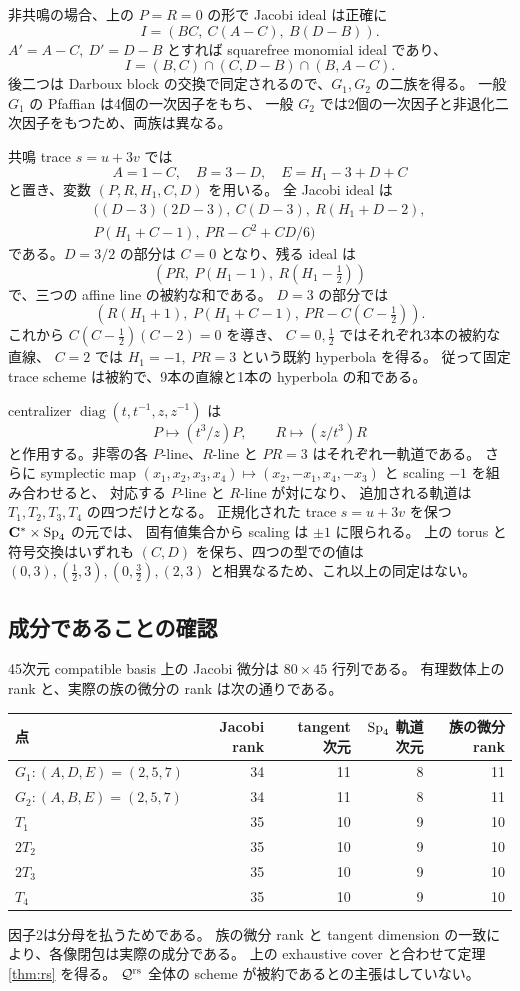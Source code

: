 \documentclass[11pt,a4paper]{ltjsarticle}
\DeclareMathOperator{\diag}{diag}
\theoremstyle{remark}\newtheorem{remark}[theorem]{注意}\renewcommand{\proofname}{証明}
\begin{document}
非共鳴の場合、上の $P=R=0$ の形で Jacobi ideal は正確に
\[
 I=(BC,\ C(A-C),\ B(D-B)).
\]
$A'=A-C,\ D'=D-B$ とすれば squarefree monomial ideal であり、
\[
 I=(B,C)\cap(C,D-B)\cap(B,A-C).
\]
後二つは Darboux block の交換で同定されるので、$G_1,G_2$ の二族を得る。
一般 $G_1$ の Pfaffian は4個の一次因子をもち、
一般 $G_2$ では2個の一次因子と非退化二次因子をもつため、両族は異なる。

共鳴 trace $s=u+3v$ では
\[
 A=1-C,\quad B=3-D,\quad E=H_1-3+D+C
\]
と置き、変数 $(P,R,H_1,C,D)$ を用いる。
全 Jacobi ideal は
\begin{equation}\label{eq:resideal}
\begin{split}
 ((D-3)(2D-3),\ C(D-3),\
 R(H_1+D-2),\\
 P(H_1+C-1),\ PR-C^2+CD/6)
\end{split}
\end{equation}
である。$D=3/2$ の部分は $C=0$ となり、残る ideal は
\[
 (PR,\ P(H_1-1),\ R(H_1-\tfrac12))
\]
で、三つの affine line の被約な和である。
$D=3$ の部分では
\[
 (R(H_1+1),\ P(H_1+C-1),\ PR-C(C-\tfrac12)).
\]
これから $C(C-\tfrac12)(C-2)=0$ を導き、
$C=0,\tfrac12$ ではそれぞれ3本の被約な直線、
$C=2$ では $H_1=-1,\ PR=3$ という既約 hyperbola を得る。
従って固定 trace scheme は被約で、9本の直線と1本の hyperbola の和である。

centralizer $\diag(t,t^{-1},z,z^{-1})$ は
\[
 P\mapsto(t^3/z)P,\qquad R\mapsto(z/t^3)R
\]
と作用する。非零の各 $P$-line、$R$-line と $PR=3$ はそれぞれ一軌道である。
さらに symplectic map
$(x_1,x_2,x_3,x_4)\mapsto(x_2,-x_1,x_4,-x_3)$ と scaling $-1$ を組み合わせると、
対応する $P$-line と $R$-line が対になり、
追加される軌道は $T_1,T_2,T_3,T_4$ の四つだけとなる。
正規化された trace $s=u+3v$ を保つ $\mathbf C^*\times\operatorname{Sp}_4$ の元では、
固有値集合から scaling は $\pm1$ に限られる。
上の torus と符号交換はいずれも $(C,D)$ を保ち、四つの型での値は
$(0,3),(\tfrac12,3),(0,\tfrac32),(2,3)$ と相異なるため、これ以上の同定はない。

\subsection{成分であることの確認}
45次元 compatible basis 上の Jacobi 微分は $80\times45$ 行列である。
有理数体上の rank と、実際の族の微分の rank は次の通りである。
\begin{center}
\begin{tabular}{lrrrr}
\toprule
点 & Jacobi rank & tangent 次元 & $\operatorname{Sp}_4$ 軌道次元 & 族の微分 rank\\
\midrule
$G_1:(A,D,E)=(2,5,7)$&34&11&8&11\\
$G_2:(A,B,E)=(2,5,7)$&34&11&8&11\\
$T_1$&35&10&9&10\\
$2T_2$&35&10&9&10\\
$2T_3$&35&10&9&10\\
$T_4$&35&10&9&10\\
\bottomrule
\end{tabular}
\end{center}
因子2は分母を払うためである。
族の微分 rank と tangent dimension の一致により、各像閉包は実際の成分である。
上の exhaustive cover と合わせて定理 \ref{thm:rs} を得る。
$\mathcal Q^{\rm rs}$ 全体の scheme が被約であるとの主張はしていない。
\end{document}
